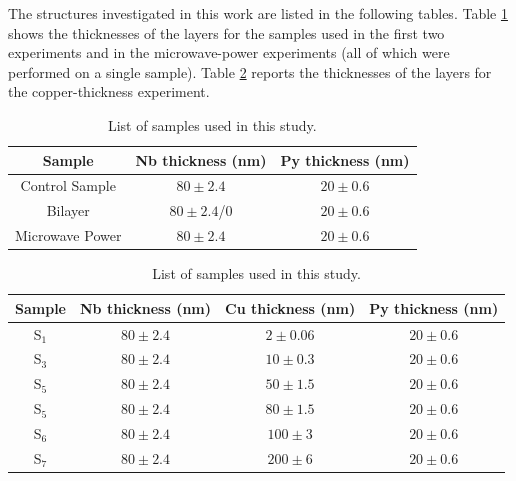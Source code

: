 \documentclass[12pt,a4paper,oneside,openany]{book}
\begin{document}
The structures investigated in this work are listed in the following tables. Table \ref{Samples_dimensions_1} shows the thicknesses of the layers for the samples used in the first two experiments and in the microwave-power experiments (all of which were performed on a single sample). Table \ref{Samples_dimensions_2} reports the thicknesses of the layers for the copper-thickness experiment.

\begin{table}[h]
	\centering
	\begin{tabular}{c c c}
		\hline
		\rule{0pt}{2.5ex}\rule[-1.2ex]{0pt}{0pt}  %
		Sample & Nb thickness (nm) & Py thickness (nm) \\
		\hline
		Control Sample & $80 \pm2.4$ & $20 \pm 0.6$            \\
		Bilayer & $80 \pm2.4$/$0$ & $20 \pm 0.6$  \\                    
		Microwave Power & $80 \pm2.4$ & $20 \pm 0.6$  \\
		\hline                   
	\end{tabular}
	\caption{List of samples used in this study.}
	\label{Samples_dimensions_1}
	\end{table}
	
\begin{table}[h]
	\centering
	\begin{tabular}{c c c c}
		\hline
		\rule{0pt}{2.5ex}\rule[-1.2ex]{0pt}{0pt}  %
		Sample & Nb thickness (nm) & Cu thickness (nm) & Py thickness (nm) \\
		\hline
		S$_1$ & $80 \pm2.4$ & $2 \pm 0.06$ & $20 \pm 0.6$ \\                   
		S$_3$ & $80 \pm2.4$ & $10 \pm 0.3$ & $20 \pm 0.6$ \\                      
		S$_5$ & $80 \pm2.4$ & $50 \pm 1.5$ & $20 \pm 0.6$ \\
		S$_5$ & $80 \pm2.4$ & $80 \pm 1.5$ & $20 \pm 0.6$ \\                 
		S$_6$ & $80 \pm2.4$ & $100 \pm 3$  & $20 \pm 0.6$ \\            
		S$_7$ & $80 \pm2.4$ & $200 \pm 6$  & $20 \pm 0.6$ \\
		\hline
	\end{tabular}
	\caption{List of samples used in this study.}
	\label{Samples_dimensions_2}
\end{table}
\end{document}

